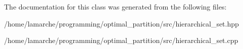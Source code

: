 The documentation for this class was generated from the following files\-:\begin{DoxyCompactItemize}
\item 
/home/lamarche/programming/optimal\-\_\-partition/src/hierarchical\-\_\-set.\-hpp\item 
/home/lamarche/programming/optimal\-\_\-partition/src/hierarchical\-\_\-set.\-cpp\end{DoxyCompactItemize}
